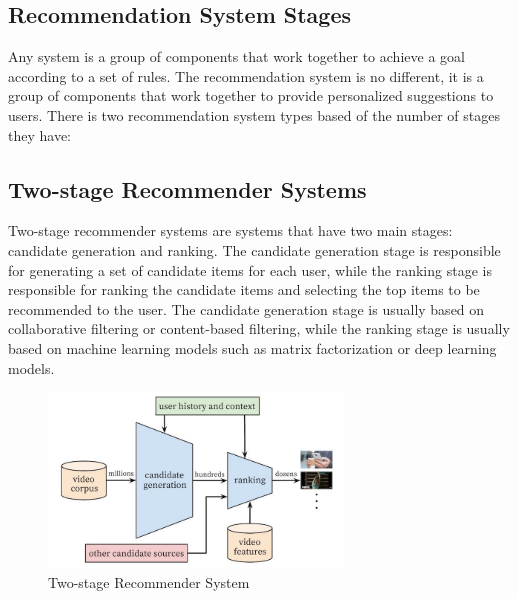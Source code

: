 \subsection{Recommendation System Stages}
Any system is a group of components that work together to achieve a goal according to a set of rules. The recommendation system is no different, it is a group of components that work together to provide personalized suggestions to users. There is two recommendation system types based of the number of stages they have:
\subsection*{Two-stage Recommender Systems}
Two-stage recommender systems are systems that have two main stages: candidate generation and ranking. The candidate generation stage is responsible for generating a set of candidate items for each user, while the ranking stage is responsible for ranking the candidate items and selecting the top items to be recommended to the user. The candidate generation stage is usually based on collaborative filtering or content-based filtering, while the ranking stage is usually based on machine learning models such as matrix factorization or deep learning models.\cite{MultiStageRecSys}
\begin{figure}[H]
    \centering
    \includegraphics[width=0.7\textwidth]{assets/Two_stage_rec_sys.jpg}
    \caption{Two-stage Recommender System\cite{MultiStageRecSys}}
\end{figure}
